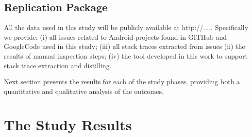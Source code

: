 \documentclass[conference]{IEEEtran}
\begin{document}




\subsection{Replication Package}
All the data used in this study will be publicly available at http://.....
Specifically we provide: (i) all issues related to Android projects found
in GITHub and GoogleCode used in this study; (iii) all stack traces extracted
from issues (ii) the results of manual inspection steps; (iv) the tool developed 
in this work to support stack trace extraction and distilling.

Next section presents the results for each of the study phases, providing both a
quantitative and qualitative analysis of the outcomes.

\section{The Study Results}
\label{sec:result}

\end{document}
